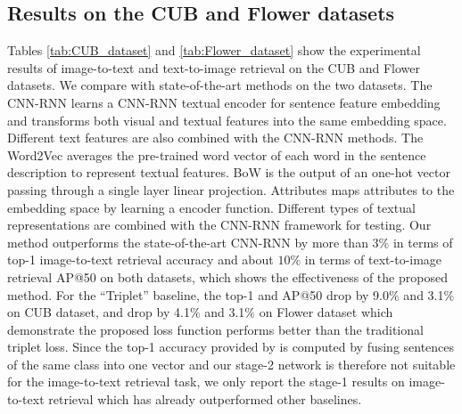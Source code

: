 \subsection{Results on the CUB and Flower datasets}
Tables \ref{tab:CUB_dataset} and \ref{tab:Flower_dataset} show the experimental results of image-to-text and text-to-image retrieval on the CUB and Flower datasets. We compare with state-of-the-art methods on the two datasets.
The CNN-RNN \cite{reed2016learning} learns a CNN-RNN textual encoder for sentence feature embedding and transforms both visual and textual features into the same embedding space.
Different text features are also combined with the CNN-RNN methods.
The Word2Vec \cite{mikolov2013distributed} averages the pre-trained word vector of each word in the sentence description to represent textual features. BoW \cite{harris1954distributional} is the output of an one-hot vector passing through a single layer linear projection. Attributes \cite{akata2015evaluation} maps attributes to the embedding space by learning a encoder function. Different types of textual representations are combined with the CNN-RNN framework for testing.
Our method outperforms the state-of-the-art CNN-RNN by more than $3\%$ in terms of top-1 image-to-text retrieval accuracy and about $10\%$ in terms of text-to-image retrieval AP@50 on both datasets, which shows the effectiveness of the proposed method.
For the ``Triplet'' baseline, the top-1 and AP@50 drop by 9.0$\%$ and 3.1$\%$ on CUB dataset, and drop by 4.1$\%$ and 3.1$\%$ on Flower dataset which demonstrate the proposed loss function performs better than the traditional triplet loss.
Since the top-1 accuracy provided by \cite{reed2016learning} is computed by fusing sentences of the same class into one vector and our stage-2 network is therefore not suitable for the image-to-text retrieval task, we only report the stage-1 results on image-to-text retrieval which has already outperformed other baselines.

